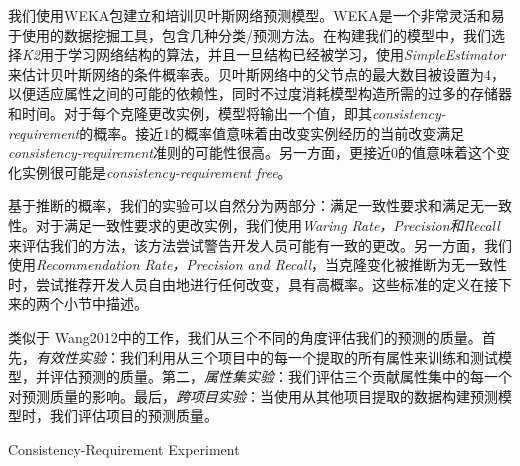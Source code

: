 我们使用WEKA包建立和培训贝叶斯网络预测模型。WEKA是一个非常灵活和易于使用的数据挖掘工具，包含几种分类/预测方法。在构建我们的模型中，我们选择{\em K2}用于学习网络结构的算法，并且一旦结构已经被学习，使用{\em  SimpleEstimator}来估计贝叶斯网络的条件概率表。贝叶斯网络中的父节点的最大数目被设置为$ 4 $，以便适应属性之间的可能的依赖性，同时不过度消耗模型构造所需的过多的存储器和时间。对于每个克隆更改实例，模型将输出一个值，即其{\em consistency-requirement}的概率。接近$ 1 $的概率值意味着由改变实例经历的当前改变满足{\em consistency-requirement}准则的可能性很高。另一方面，更接近$ 0 $的值意味着这个变化实例很可能是{\em consistency-requirement free}。

基于推断的概率，我们的实验可以自然分为两部分：满足一致性要求和满足无一致性。对于满足一致性要求的更改实例，我们使用{\em Waring Rate，Precision和Recall}来评估我们的方法，该方法尝试警告开发人员可能有一致的更改。另一方面，我们使用{\em Recommendation Rate，Precision and Recall}，当克隆变化被推断为无一致性时，尝试推荐开发人员自由地进行任何改变，具有高概率。这些标准的定义在接下来的两个小节中描述。

类似于\cite{} {Wang2012}中的工作，我们从三个不同的角度评估我们的预测的质量。首先，{\em 有效性实验}：我们利用从三个项目中的每一个提取的所有属性来训练和测试模型，并评估预测的质量。第二，{\em 属性集实验}：我们评估三个贡献属性集中的每一个对预测质量的影响。最后，{\em 跨项目实验}：当使用从其他项目提取的数据构建预测模型时，我们评估项目的预测质量。


{Consistency-Requirement Experiment}

